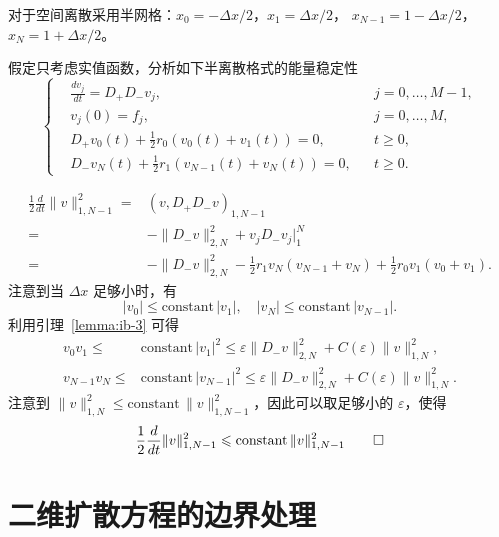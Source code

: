 对于空间离散采用半网格：$x_0 = -\Delta x/2$，$x_1 = \Delta x/2$，
$x_{N-1} = 1-\Delta x/2$，$x_N = 1+\Delta x/2$。


\begin{example}
    假定只考虑实值函数，分析如下半离散格式的能量稳定性
    \[
        \left\{
        \begin{aligned}
             & \frac{d v_j}{d t} = D_+ D_- v_j,                    &  & j=0,\dots,M-1, \\
             & v_j(0) = f_j,                                       &  & j=0,\dots,M,   \\
             & D_+ v_0(t) + \frac12 r_0 (v_0(t) + v_1(t)) = 0,     &  & t \ge 0,       \\
             & D_- v_N(t) + \frac12 r_1 (v_{N-1}(t) + v_N(t)) = 0, &  & t \ge 0.
        \end{aligned}
        \right.
    \]
\end{example}

\begin{solution*}
    \begin{align*}
        \frac12 \frac{d}{dt} \|v\|_{1,N-1}^2
        ={} & \left( v,D_+ D_- v \right)_{1,N-1}                                             \\
        ={} & - \| D_- v\|_{2,N}^2 + v_j D_- v_j \big|_1^N                                   \\
        ={} & - \| D_- v\|_{2,N}^2 - \frac12 r_1 v_N(v_{N-1}+v_N) + \frac12 r_0 v_1(v_0+v_1).
    \end{align*}
    注意到当 $\Delta x$ 足够小时，有
    \[
        |v_0| \le \text{constant}\, |v_1|,\quad
        |v_N| \le \text{constant}\, |v_{N-1}|.
    \]
    利用引理~\ref{lemma:ib-3} 可得
    \begin{align*}
        v_0 v_1 \le{}     & \text{constant}\, |v_1|^2 \le \varepsilon \|D_-v\|_{2,N}^2 + C(\varepsilon) \|v\|_{1,N}^2,     \\
        v_{N-1} v_N \le{} & \text{constant}\, |v_{N-1}|^2 \le \varepsilon \|D_-v\|_{2,N}^2 + C(\varepsilon) \|v\|_{1,N}^2.
    \end{align*}
    注意到 $\|v\|_{1,N}^2 \le \text{constant}\, \|v\|_{1,N-1}^2$，因此可以取足够小的 $\varepsilon$，使得
    \[
        \frac12 \frac{d}{dt} \|v\|_{1,N-1}^2 \le \text{constant}\, \|v\|_{1,N-1}^2 \qedhere
    \]
\end{solution*}


\section{二维扩散方程的边界处理}


